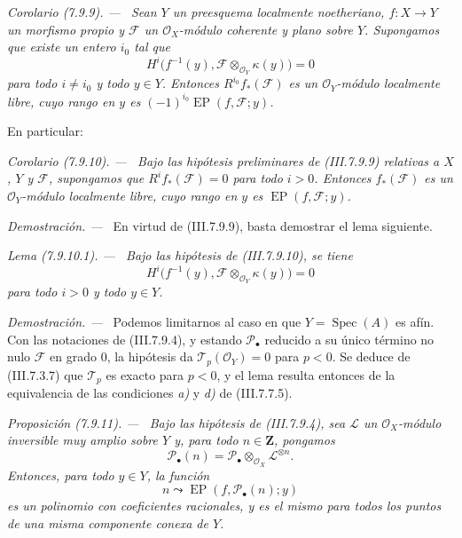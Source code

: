 \documentclass[10pt,oneside]{book}
\newcommand{\bb}[1]{\mathbf{#1}}
\newcommand{\kres}{\kappa}
\newcommand{\Spec}{\operatorname{Spec}}
\newcommand{\sref}[2][]{\textup{(#2)}}
\newcommand{\oldpage}[2][]{\setcounter{footnote}{0}\marginpar{\scriptsize\textbf{#1}~|~#2}\ignorespaces}
\newenvironment{proposition}[1][]{\par\medskip\noindent\itshape Proposición (#1). ---\ }{\par}
\newenvironment{lemma}[1][]{\par\medskip\noindent\itshape Lema (#1). ---\ }{\par}
\newenvironment{corollary}[1][]{\par\medskip\noindent\itshape Corolario (#1). ---\ }{\par}
\newenvironment{proof}{\par\medskip\noindent\textit{Demostración. ---\ }}{\par}
\providecommand{\setmin}{-}%
\begin{document}
\begin{corollary}[7.9.9]
\label{III.7.9.9}
Sean $Y$ un preesquema localmente noetheriano,
$f:X\to Y$ un morfismo propio y $\mathscr F$ un
$\mathscr O_X$-módulo coherente y plano sobre $Y$. Supongamos que
existe un entero $i_0$ tal que
\[
  H^i\bigl(f^{-1}(y),
    \mathscr F\otimes_{\mathscr O_Y}\kres(y)\bigr)=0
\]
para todo $i\neq i_0$ y todo $y\in Y$. Entonces
$R^{i_0}f_*(\mathscr F)$ es un $\mathscr O_Y$-módulo localmente
libre, cuyo rango en $y$ es
$(\setmin 1)^{i_0}\operatorname{EP}(f,\mathscr F;y)$.
\end{corollary}

En particular:

\begin{corollary}[7.9.10]
\label{III.7.9.10}
Bajo las hipótesis preliminares de \textup{\sref{III.7.9.9}} relativas a
$X$, $Y$ y $\mathscr F$, supongamos que
$R^if_*(\mathscr F)=0$ para todo $i>0$. Entonces
$f_*(\mathscr F)$ es un $\mathscr O_Y$-módulo localmente libre,
cuyo rango en $y$ es $\operatorname{EP}(f,\mathscr F;y)$.
\end{corollary}

\begin{proof}
En virtud de \sref{III.7.9.9}, basta demostrar el lema siguiente.
\end{proof}

\begin{lemma}[7.9.10.1]
\label{III.7.9.10.1}
Bajo las hipótesis de \textup{\sref{III.7.9.10}}, se tiene
\[
  H^i\bigl(f^{-1}(y),
    \mathscr F\otimes_{\mathscr O_Y}\kres(y)\bigr)=0
\]
para todo $i>0$ y todo $y\in Y$.
\end{lemma}

\begin{proof}
Podemos limitarnos al caso en que $Y=\Spec(A)$ es afín.
Con las notaciones de \sref{III.7.9.4}, y estando
$\mathscr P_\bullet$ reducido a su único término no nulo
$\mathscr F$ en grado $0$, la hipótesis da
$\mathscr T_p(\mathscr O_Y)=0$ para $p<0$. Se deduce de
\sref{III.7.3.7} que $\mathscr T_p$ es exacto para $p<0$, y el
lema resulta entonces de la equivalencia de las condiciones \emph{a)} y
\emph{d)} de \sref{III.7.7.5}.
\end{proof}

\oldpage[III]{211}
\begin{proposition}[7.9.11]
\label{III.7.9.11}
Bajo las hipótesis de \textup{\sref{III.7.9.4}}, sea $\mathscr L$ un
$\mathscr O_X$-módulo inversible muy amplio sobre $Y$ y, para todo
$n\in\bb Z$, pongamos
\[
  \mathscr P_\bullet(n)
  =
  \mathscr P_\bullet
    \otimes_{\mathscr O_X}\mathscr L^{\otimes n}.
\]
Entonces, para todo $y\in Y$, la función
\[
  n\leadsto
  \operatorname{EP}(f,\mathscr P_\bullet(n);y)
  \tag{7.9.11.1}\label{III.7.9.11.1}
\]
es un polinomio con coeficientes racionales, y es el mismo para
todos los puntos de una misma componente conexa de $Y$.
\end{proposition}
\end{document}
